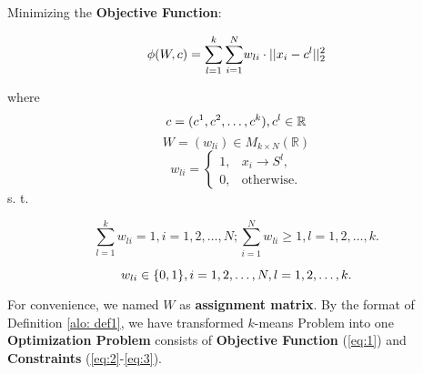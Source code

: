     \begin{definition}
    \label{alo: def2}
	Minimizing the \textbf{Objective Function}:
	
	\begin{equation}{\label{eq:1}}
	\phi(W, c) = {\sum_{l=1}^{k}\sum_{i=1}^{N}} w_{li} \cdot ||x_{i} - c^{l}||^{2}_{2}
	\end{equation}

	where
	\begin{equation}{\label{eq:2}}
	c = (c^{1}, c^{2}, \dots, c^{k}), c^{l} \in\mathbb{R}
	\end{equation}
	\begin{equation}
        W =(w_{li}) \in M_{k\times N}(\mathbb{R})
	\end{equation}	
	\begin{equation}
	w_{li} = \begin{cases} 1,&\text{$x_{i} \to S^{l}$},\\
	0,&\text{otherwise}.
	\end{cases}	
	\end{equation}
	s. t.

	\begin{equation}
	\sum_{l=1}^{k} w_{li} = 1, i = 1, 2, \dots, N; \sum_{i=1}^{N}w_{li}\geq 1, l = 1, 2, \dots, k.
	\end{equation}

	\begin{equation}{\label{eq:3}}
	w_{li} \in \{0, 1\}, i = 1, 2, \ldots, N, l = 1, 2, \dots, k.
	\end{equation}
    \end{definition}
    
        For convenience, we named $W$ as \textbf{assignment matrix}. By the format of Definition \ref{alo: def1}, we have transformed $k$-means Problem into one \textbf{Optimization Problem} consists of \textbf{Objective Function} (\ref{eq:1}) and \textbf{Constraints} (\ref{eq:2}-\ref{eq:3}). 
            
